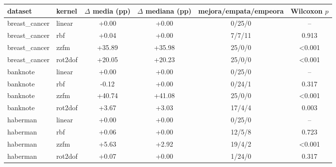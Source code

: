 \begin{tabular}{llcccc}
\hline
dataset & kernel & $\Delta$ media (pp) & $\Delta$ mediana (pp) & mejora/empata/empeora & Wilcoxon $p$ \\
\hline
breast\_cancer & linear & +0.00 & +0.00 & 0/25/0 & -- \\
breast\_cancer & rbf & +0.04 & +0.00 & 7/7/11 & 0.913 \\
breast\_cancer & zzfm & +35.89 & +35.98 & 25/0/0 & <0.001 \\
breast\_cancer & rot2dof & +20.05 & +20.23 & 25/0/0 & <0.001 \\
banknote & linear & +0.00 & +0.00 & 0/25/0 & -- \\
banknote & rbf & -0.12 & +0.00 & 0/24/1 & 0.317 \\
banknote & zzfm & +40.74 & +41.08 & 25/0/0 & <0.001 \\
banknote & rot2dof & +3.67 & +3.03 & 17/4/4 & 0.003 \\
haberman & linear & +0.00 & +0.00 & 0/25/0 & -- \\
haberman & rbf & +0.06 & +0.00 & 12/5/8 & 0.723 \\
haberman & zzfm & +5.63 & +2.92 & 19/4/2 & <0.001 \\
haberman & rot2dof & +0.07 & +0.00 & 1/24/0 & 0.317 \\
\hline
\end{tabular}
